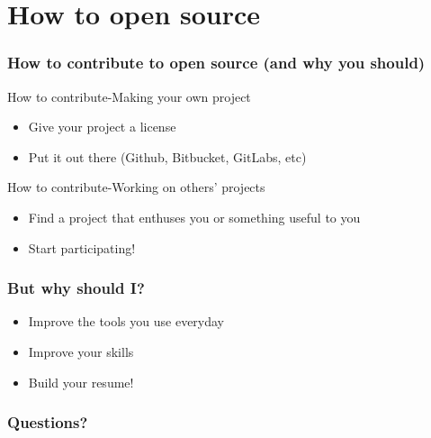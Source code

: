 \documentclass[8pt]{beamer}
\begin{document}
\section{How to open source}
\begin{frame}
	\frametitle{How to contribute to open source (and why you should)}
	How to contribute-Making your own project\\
	\begin{itemize}
		\item Give your project a license
		\item Put it out there (Github, Bitbucket, GitLabs, etc)
	\end{itemize}
	How to contribute-Working on others' projects\\
	\begin{itemize}
		\item Find a project that enthuses you or something useful to you
		\item Start participating!
	\end{itemize}
\end{frame}

\begin{frame}
	\frametitle{But why should I?}
	\begin{itemize}
		\item Improve the tools you use everyday
		\item Improve your skills
		\item Build your resume!
	\end{itemize}
\end{frame}

\begin{frame}
	\frametitle{Questions?}
\end{frame}
\end{document}
